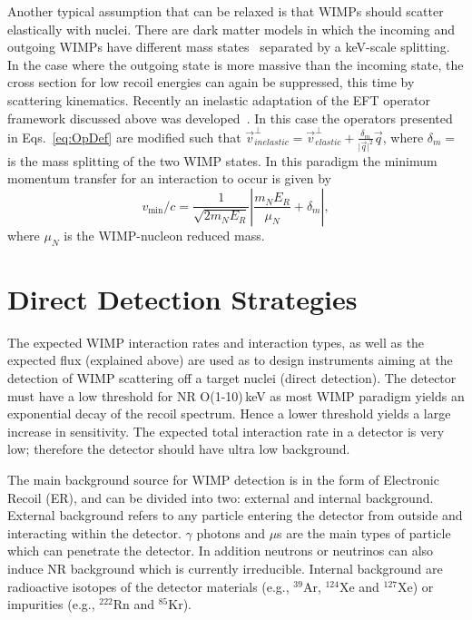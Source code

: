 Another typical assumption that can be relaxed is that WIMPs should scatter elastically with nuclei. There are dark matter models in which the incoming and outgoing WIMPs have different mass states~\cite{InelasticIntro} separated by a keV-scale splitting. In the case where the outgoing state is more massive than the incoming state, the cross section for low recoil energies can again be suppressed, this time by scattering kinematics. Recently an inelastic adaptation of the EFT operator framework discussed above was developed~\cite{InelasticMath}. In this case the operators presented in Eqs.~\ref{eq:OpDef} are modified such that $\vec{v}^{\perp}_{inelastic} = \vec{v}^{\perp}_{elastic} +\frac{\delta_m}{\vert{\vec{q}}\vert^2}\vec{q}$, where $\delta_m = $ is the mass splitting of the two WIMP states. In this paradigm the minimum momentum transfer for an interaction to occur is given by
\begin{equation}
  v_\mathrm{min}/c = \frac{1}{\sqrt{2 m_N E_R}} \left|\frac{m_N E_R}{\mu_N} + \delta_m\right|,
\end{equation}
where $\mu_N$ is the WIMP-nucleon reduced mass.



\section{Direct Detection Strategies}
\label{sec:detStrtegies}

The expected WIMP interaction rates and interaction types, as well as the expected flux (explained above) are used as to design instruments aiming at the detection of WIMP scattering off a target nuclei (direct detection). The detector must have a low threshold for NR O(1-10)\,keV as most WIMP paradigm yields an exponential decay of the recoil spectrum. Hence a lower threshold yields a large increase in sensitivity. The expected total interaction rate in a detector is very low; therefore the detector should have ultra low background.

The main background source for WIMP detection is in the form of Electronic Recoil (ER), and can be divided into two: external and internal background. External background refers to any particle entering the detector from outside and interacting within the detector. $\gamma$ photons and $\mu$s are the main types of particle which can penetrate the detector. In addition neutrons or neutrinos can also induce NR background which is currently irreducible. Internal background are radioactive isotopes of the detector materials (e.g., $^{39}$Ar, $^{124}$Xe and $^{127}$Xe) or impurities (e.g., $^{222}$Rn and $^{85}$Kr).



